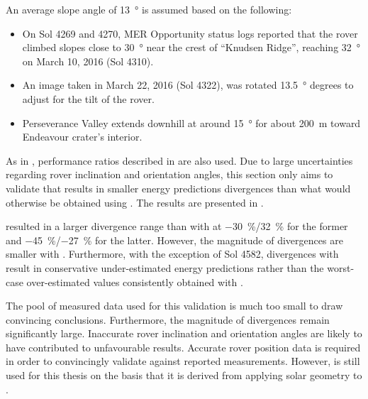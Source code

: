 An average slope angle of \SI{13}{\degree} is assumed based on the following:
\begin{itemize}
  \item On Sol 4269 and 4270, \ac{MER} Opportunity status logs reported that the rover climbed slopes close to \SI{30}{\degree} near the crest of ``Knudsen Ridge'', reaching \SI{32}{\degree} on March 10, 2016 (Sol 4310).
  \item An image taken in March 22, 2016 (Sol 4322), was rotated \SI{13.5}{\degree} degrees to adjust for the tilt of the rover.
  \item Perseverance Valley extends downhill at around \SI{15}{\degree} for about \SI{200}{\meter} toward Endeavour crater's interior.
\end{itemize}

As in , performance ratios described in  are also used. Due to large uncertainties regarding rover inclination and orientation angles, this section only aims to validate that  results in smaller energy predictions divergences than what would otherwise be obtained using . The results are presented in .




 resulted in a larger divergence range than with  at \SI{-30}{\percent}/\SI{32}{\percent} for the former and \SI{-45}{\percent}/\SI{-27}{\percent} for the latter. However, the magnitude of divergences are smaller with . Furthermore, with the exception of Sol 4582, divergences with  result in conservative under-estimated energy predictions rather than the worst-case over-estimated values consistently obtained with .

The pool of measured data used for this validation is much too small to draw convincing conclusions. Furthermore, the magnitude of divergences remain significantly large. Inaccurate rover inclination and orientation angles are likely to have contributed to unfavourable results. Accurate rover position data is required in order to convincingly validate  against reported measurements. However,  is still used for this thesis on the basis that it is derived from applying solar geometry to .

